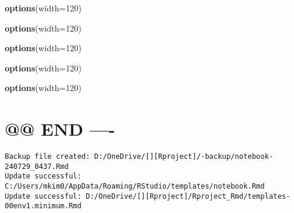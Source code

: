 \documentclass[
]{article}
\newenvironment{Shaded}{\begin{snugshade}}{\end{snugshade}}
\newcommand{\AttributeTok}[1]{\textcolor[rgb]{0.13,0.29,0.53}{#1}}
\newcommand{\DecValTok}[1]{\textcolor[rgb]{0.00,0.00,0.81}{#1}}
\newcommand{\FunctionTok}[1]{\textcolor[rgb]{0.13,0.29,0.53}{\textbf{#1}}}
\newcommand{\NormalTok}[1]{#1}
\begin{document}
\begin{Shaded}
\begin{Highlighting}[]
\FunctionTok{options}\NormalTok{(}\AttributeTok{width=}\DecValTok{120}\NormalTok{)}
\end{Highlighting}
\end{Shaded}

\begin{Shaded}
\begin{Highlighting}[]
\FunctionTok{options}\NormalTok{(}\AttributeTok{width=}\DecValTok{120}\NormalTok{)}
\end{Highlighting}
\end{Shaded}

\begin{Shaded}
\begin{Highlighting}[]
\FunctionTok{options}\NormalTok{(}\AttributeTok{width=}\DecValTok{120}\NormalTok{)}
\end{Highlighting}
\end{Shaded}

\begin{Shaded}
\begin{Highlighting}[]
\FunctionTok{options}\NormalTok{(}\AttributeTok{width=}\DecValTok{120}\NormalTok{)}
\end{Highlighting}
\end{Shaded}

\begin{Shaded}
\begin{Highlighting}[]
\FunctionTok{options}\NormalTok{(}\AttributeTok{width=}\DecValTok{120}\NormalTok{)}
\end{Highlighting}
\end{Shaded}

\hypertarget{end--}{%
\section{@@ END ----}\label{end--}}

\begin{verbatim}
Backup file created: D:/OneDrive/[][Rproject]/-backup/notebook-240729_0437.Rmd
Update successful: C:/Users/mkim0/AppData/Roaming/RStudio/templates/notebook.Rmd
Update successful: D:/OneDrive/[][Rproject]/Rproject_Rmd/templates-00env1.minimum.Rmd
\end{verbatim}
\end{document}
